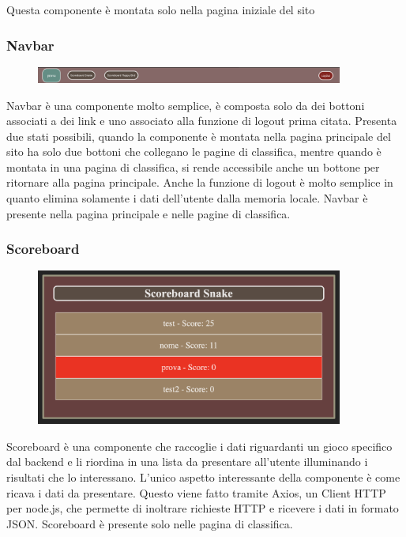 \documentclass{article}
\begin{document}
Questa componente è montata solo nella pagina iniziale del sito


\subsubsection{Navbar}
\begin{figure}[H]
    \centering
    \includegraphics[width=0.9\textwidth]{images/Navbar.png}
\end{figure}
Navbar è una componente molto semplice, è composta solo da dei bottoni associati a dei link e uno associato alla funzione di logout prima citata.
Presenta due stati possibili, quando la componente è montata nella pagina principale del sito ha solo due bottoni che collegano le pagine di classifica,
mentre quando è montata in una pagina di classifica, si rende accessibile anche un bottone per ritornare alla pagina principale.
Anche la funzione di logout è molto semplice in quanto elimina solamente i dati dell'utente dalla memoria locale.
Navbar è presente nella pagina principale e nelle pagine di classifica.

\subsubsection{Scoreboard}
\begin{figure}[H]
    \centering
    \includegraphics[width=0.9\textwidth]{images/Scoreboard.png}
\end{figure}
Scoreboard è una componente che raccoglie i dati riguardanti un gioco specifico dal backend e li riordina in una lista da presentare all'utente 
illuminando i risultati che lo interessano. L'unico aspetto interessante della componente è come ricava i dati da presentare.
Questo viene fatto tramite Axios, un Client HTTP per node.js, che permette di inoltrare richieste HTTP e ricevere i dati in formato JSON.
Scoreboard è presente solo nelle pagina di classifica.
\end{document}
